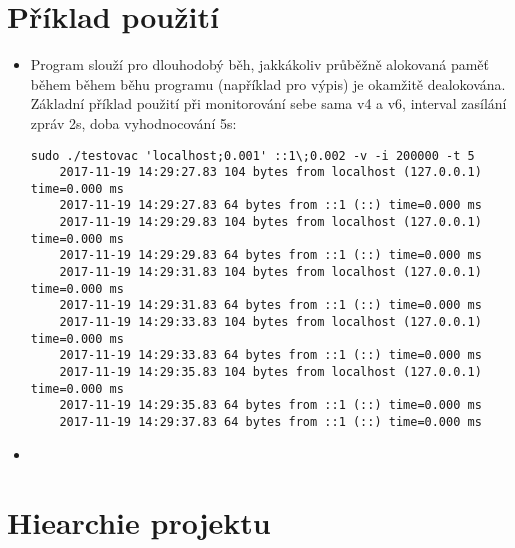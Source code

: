 \documentclass[a4paper,11pt]{article}
\begin{document}
\section*{Příklad použití}
\begin{itemize}
  \item Program slouží pro dlouhodobý běh, jakkákoliv průběžně alokovaná paměť během během běhu programu (například pro výpis) je okamžitě dealokována. Základní příklad použití při monitorování sebe sama v4 a v6, interval zasílání zpráv 2s, doba vyhodnocování 5s:

  \lstset{language=Bash}
  \begin{lstlisting}[frame=single,breaklines]
    sudo ./testovac 'localhost;0.001' ::1\;0.002 -v -i 200000 -t 5
    2017-11-19 14:29:27.83 104 bytes from localhost (127.0.0.1) time=0.000 ms
    2017-11-19 14:29:27.83 64 bytes from ::1 (::) time=0.000 ms
    2017-11-19 14:29:29.83 104 bytes from localhost (127.0.0.1) time=0.000 ms
    2017-11-19 14:29:29.83 64 bytes from ::1 (::) time=0.000 ms
    2017-11-19 14:29:31.83 104 bytes from localhost (127.0.0.1) time=0.000 ms
    2017-11-19 14:29:31.83 64 bytes from ::1 (::) time=0.000 ms
    2017-11-19 14:29:33.83 104 bytes from localhost (127.0.0.1) time=0.000 ms
    2017-11-19 14:29:33.83 64 bytes from ::1 (::) time=0.000 ms
    2017-11-19 14:29:35.83 104 bytes from localhost (127.0.0.1) time=0.000 ms
    2017-11-19 14:29:35.83 64 bytes from ::1 (::) time=0.000 ms
    2017-11-19 14:29:37.83 64 bytes from ::1 (::) time=0.000 ms
  \end{lstlisting}
  \item

\end{itemize}

\section*{Hiearchie projektu}
\end{document}
